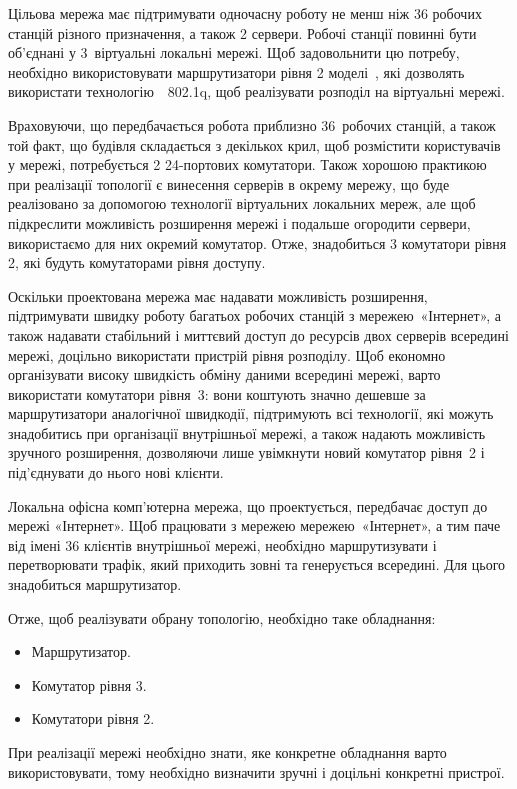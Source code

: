 \documentclass[
  ukrainian,
  simple,
  floatsection,
]{eskdnaukvd}
\begin{document}
      Цільова мережа має підтримувати одночасну роботу не менш ніж 36 робочих станцій різного призначення, а також 2 сервери. Робочі станції повинні бути об'єднані у 3~віртуальні локальні мережі. Щоб задовольнити цю потребу, необхідно використовувати маршрутизатори рівня 2 моделі~\textenglish{}, які дозволять використати технологію~\textenglish{~802.1q}, щоб реалізувати розподіл на віртуальні мережі.

      Враховуючи, що передбачається робота приблизно 36~робочих станцій, а також той факт, що будівля складається з декількох крил, щоб розмістити користувачів у мережі, потребується 2 24-портових комутатори. Також хорошою практикою при реалізації топології є винесення серверів в окрему мережу, що буде реалізовано за допомогою технології віртуальних локальних мереж, але щоб підкреслити можливість розширення мережі і подальше огородити сервери, використаємо для них окремий комутатор. Отже, знадобиться 3 комутатори рівня 2, які будуть комутаторами рівня доступу.

      Оскільки проектована мережа має надавати можливість розширення, підтримувати швидку роботу багатьох робочих станцій з мережею~«Інтернет», а також надавати стабільний і миттєвий доступ до ресурсів двох серверів всередині мережі, доцільно використати пристрій рівня розподілу. Щоб економно організувати високу швидкість обміну даними всередині мережі, варто використати комутатори рівня~3: вони коштують значно дешевше за маршрутизатори аналогічної швидкодії, підтримують всі технології, які можуть знадобитись при організації внутрішньої мережі, а також надають можливість зручного розширення, дозволяючи лише увімкнути новий комутатор рівня~2 і під'єднувати до нього нові клієнти.

      Локальна офісна комп'ютерна мережа, що проектується, передбачає доступ до мережі «Інтернет». Щоб працювати з мережею мережею~«Інтернет», а тим паче від імені 36 клієнтів внутрішньої мережі, необхідно маршрутизувати і перетворювати трафік, який приходить зовні та генерується всередині. Для цього знадобиться маршрутизатор.

      Отже, щоб реалізувати обрану топологію, необхідно таке обладнання:
      \begin{itemize}
        \item Маршрутизатор.
        \item Комутатор рівня 3.
        \item Комутатори рівня 2.
      \end{itemize}
      При реалізації мережі необхідно знати, яке конкретне обладнання варто використовувати, тому необхідно визначити зручні і доцільні конкретні пристрої.
\end{document}
